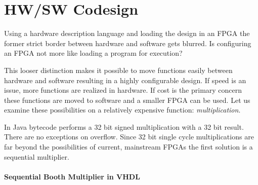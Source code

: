
\section{HW/SW Codesign}
\label{sec:hwsw:co}

Using a hardware description language and loading the design in an
FPGA the former strict border between hardware and software gets
blurred. Is configuring an FPGA not more like loading a program for
execution?

This looser distinction makes it possible to move functions easily
between hardware and software resulting in a highly configurable
design. If speed is an issue, more functions are realized in
hardware. If cost is the primary concern these functions are moved
to software and a smaller FPGA can be used. Let us examine these
possibilities on a relatively expensive function:
\emph{multiplication}.

In Java bytecode  performs a 32 bit signed multiplication
with a 32 bit result. There are no exceptions on overflow. Since 32
bit single cycle multiplications are far beyond the possibilities of
current, mainstream FPGAs the first solution is a sequential
multiplier.

\paragraph{Sequential Booth Multiplier in VHDL}

